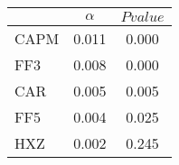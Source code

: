\begin{tabular}{lcc}
\toprule
 & $\alpha$ & $Pvalue$ \\
\midrule
CAPM & 0.011 & 0.000 \\
FF3 & 0.008 & 0.000 \\
CAR & 0.005 & 0.005 \\
FF5 & 0.004 & 0.025 \\
HXZ & 0.002 & 0.245 \\
\bottomrule
\end{tabular}
